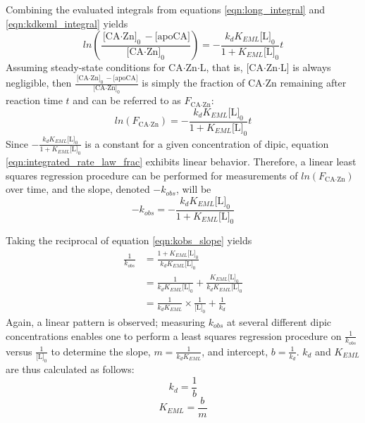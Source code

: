Combining the evaluated integrals from equations \eqref{eqn:long_integral} and \eqref{eqn:kdkeml_integral} yields
\begin{equation}\label{eqn:integrated_rate_law}
ln \left( \frac{\text{[CA$\cdot$Zn]}_0 - \text{[apoCA]}}{\text{[CA$\cdot$Zn]}_0} \right) 
=
-\frac{k_{d}K_{EML}\text{[L]}_0}{1+K_{EML}\text{[L]}_0}t 
\end{equation}
Assuming steady-state conditions for CA$\cdot$Zn$\cdot$L, that is, [CA$\cdot$Zn$\cdot$L] is always negligible, then $\frac{\text{[CA$\cdot$Zn]}_0 - \text{[apoCA]}}{\text{[CA$\cdot$Zn]}_0}$ is simply the fraction of CA$\cdot$Zn remaining after reaction time $t$ and can be referred to as $F_\text{CA$\cdot$Zn}$:
\begin{equation}\label{eqn:integrated_rate_law_frac}
ln \left( F_\text{CA$\cdot$Zn} \right)
=
-\frac{k_{d}K_{EML}\text{[L]}_0}{1+K_{EML}\text{[L]}_0}t
\end{equation}
Since $-\frac{k_{d}K_{EML}\text{[L]}_0}{1+K_{EML}\text{[L]}_0}$ is a constant for a given concentration of dipic, equation \eqref{eqn:integrated_rate_law_frac} exhibits linear behavior. Therefore, a linear least squares regression procedure can be performed for measurements of $ln \left( F_\text{CA$\cdot$Zn} \right)$ over time, and the slope, denoted $-k_{obs}$, will be 
\begin{equation}\label{eqn:kobs_slope}
-k_{obs}
=
-\frac{k_{d}K_{EML}\text{[L]}_0}{1+K_{EML}\text{[L]}_0}
\end{equation}

Taking the reciprocal of equation \eqref{eqn:kobs_slope} yields
\begin{equation}\label{eqn:kobs_slope_reciprocal}
\begin{split}
\frac{1}{k_{obs}}
&=
\frac{1+K_{EML}\text{[L]}_0}{k_{d}K_{EML}\text{[L]}_0} \\
&= \frac{1}{k_{d}K_{EML}\text{[L]}_0} + \frac{K_{EML}\text{[L]}_0}{k_{d}K_{EML}\text{[L]}_0} \\
&= \frac{1}{k_{d}K_{EML}} \times \frac{1}{\text{[L]}_0} + \frac{1}{k_{d}}
\end{split}
\end{equation}
Again, a linear pattern is observed; measuring $k_{obs}$ at several different dipic concentrations enables one to perform a least squares regression procedure on $\frac{1}{k_{obs}}$ versus $\frac{1}{\text{[L]}_0}$ to determine the slope, $m=\frac{1}{k_{d}K_{EML}}$, and intercept, $b=\frac{1}{k_{d}}$. $k_d$ and $K_{EML}$ are thus calculated as follows:
\begin{equation}\label{eqn:calculating_kd}
k_d=\frac{1}{b}
\end{equation}
\begin{equation}\label{eqn:calculating_keml}
K_{EML}=\frac{b}{m}
\end{equation}

